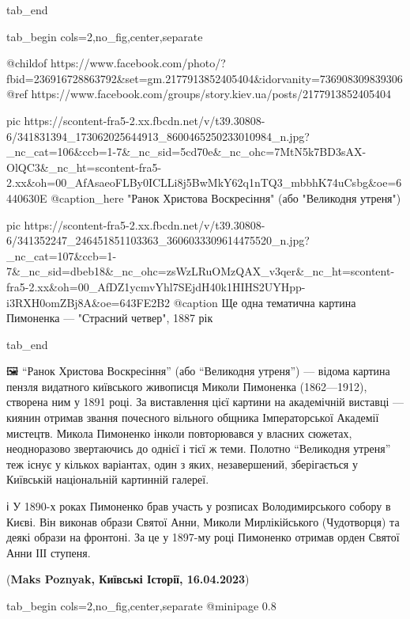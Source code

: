   tab_end
\fi

\begin{center}
\begin{minipage}{\textwidth}

\ifcmt
  tab_begin cols=2,no_fig,center,separate

    @childof https://www.facebook.com/photo/?fbid=236916728863792&set=gm.2177913852405404&idorvanity=736908309839306
    @ref https://www.facebook.com/groups/story.kiev.ua/posts/2177913852405404

    pic https://scontent-fra5-2.xx.fbcdn.net/v/t39.30808-6/341831394_173062025644913_8600465250233010984_n.jpg?_nc_cat=106&ccb=1-7&_nc_sid=5cd70e&_nc_ohc=7MtN5k7BD3sAX-OlQC3&_nc_ht=scontent-fra5-2.xx&oh=00_AfAsaeoFLBy0ICLLi8j5BwMkY62q1nTQ3_mbbhK74uCsbg&oe=6440630E
    @caption_here "Ранок Христова Воскресіння" (або "Великодня утреня")

    pic https://scontent-fra5-2.xx.fbcdn.net/v/t39.30808-6/341352247_246451851103363_3606033309614475520_n.jpg?_nc_cat=107&ccb=1-7&_nc_sid=dbeb18&_nc_ohc=zsWzLRuOMzQAX_v3qer&_nc_ht=scontent-fra5-2.xx&oh=00_AfDZ1ycmvYhl7SEjdH40k1HIHS2UYHpp-i3RXH0omZBj8A&oe=643FE2B2
    @caption Ще одна тематична картина Пимоненка — "Страсний четвер", 1887 рік

  tab_end
\fi

\small

🖼 \enquote{Ранок Христова Воскресіння} (або \enquote{Великодня утреня}) — відома картина пензля
видатного київського живописця Миколи Пимоненка (1862—1912), створена ним у
1891 році. За виставлення цієї картини на академічній виставці — киянин отримав
звання почесного вільного общника Імператорської Академії мистецтв. Микола
Пимоненко інколи повторювався у власних сюжетах, неодноразово звертаючись до
однієї і тієї ж теми. Полотно \enquote{Великодня утреня} теж існує у кількох варіантах,
один з яких, незавершений, зберігається у Київській національній картинній
галереї.

ℹ️ У 1890-х роках Пимоненко брав участь у розписах Володимирського собору в
Києві. Він виконав образи Святої Анни, Миколи Мирлікійського (Чудотворця) та
деякі образи на фронтоні. За це у 1897-му році Пимоненко отримав орден Святої
Анни ІІІ ступеня.

(\textbf{Maks Poznyak, Київські Історії, 16.04.2023})
\end{minipage}
\end{center}

\ifcmt
  tab_begin cols=2,no_fig,center,separate
     @minipage 0.8

